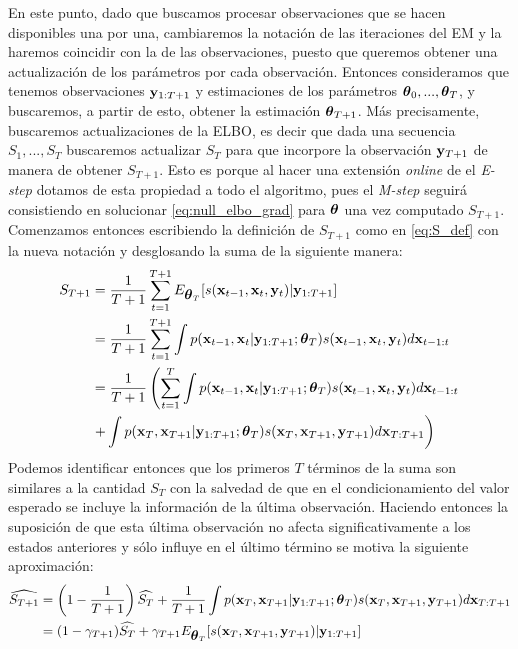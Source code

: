 En este punto, dado que buscamos procesar observaciones que se hacen disponibles una por una, cambiaremos la notación de las iteraciones del EM y la haremos coincidir con la de las observaciones, puesto que queremos obtener una actualización de los parámetros por cada observación. Entonces consideramos que tenemos observaciones $\mathbf{y}_{1:T+1}$ y estimaciones de los parámetros $\mbox{\boldmath$ \theta $}_0, ..., \mbox{\boldmath$ \theta $}_T$, y buscaremos, a partir de esto, obtener la estimación $\mbox{\boldmath$ \theta $}_{T+1}$. Más precisamente, buscaremos actualizaciones de la ELBO, es decir que dada una secuencia $S_1, ..., S_T$ buscaremos actualizar $S_T$ para que incorpore la observación $\mathbf{y}_{T+1}$ de manera de obtener $S_{T+1}$. Esto es porque al hacer una extensión \textit{online} de el \textit{E-step} dotamos de esta propiedad a todo el algoritmo, pues el \textit{M-step} seguirá consistiendo en solucionar \ref{eq:null_elbo_grad} para $\mbox{\boldmath$ \theta $}$ una vez computado $S_{T+1}$. Comenzamos entonces escribiendo la definición de $S_{T+1}$ como en \ref{eq:S_def} con la nueva notación y desglosando la suma de la siguiente manera:
\begin{align}
    S_{T+1} &= \frac{1}{T+1}\sum_{t=1}^{T+1} E_{\mbox{\boldmath$ \theta $}_T} [s(\mathbf{x}_{t-1}, \mathbf{x}_t, \mathbf{y}_t) | \mathbf{y}_{1:T+1}] \\
    &= \frac{1}{T+1}\sum_{t=1}^{T+1} \int p(\mathbf{x}_{t-1}, \mathbf{x}_t | \mathbf{y}_{1:T+1}; \mbox{\boldmath$ \theta $}_T) s(\mathbf{x}_{t-1}, \mathbf{x}_t, \mathbf{y}_t) d\mathbf{x}_{t-1:t}\\
    &= \frac{1}{T+1} \left( \sum_{t=1}^{T} \int p(\mathbf{x}_{t-1}, \mathbf{x}_t | \mathbf{y}_{1:T+1}; \mbox{\boldmath$ \theta $}_T) s(\mathbf{x}_{t-1}, \mathbf{x}_t, \mathbf{y}_t)  d\mathbf{x}_{t-1:t} \right.\\ 
    &\left. + \int p(\mathbf{x}_{T}, \mathbf{x}_{T+1} | \mathbf{y}_{1:T+1}; \mbox{\boldmath$ \theta $}_T) s(\mathbf{x}_{T}, \mathbf{x}_{T+1}, \mathbf{y}_{T+1}) d\mathbf{x}_{T:T+1} \right)
\end{align}
Podemos identificar entonces que los primeros $T$ términos de la suma son similares a la cantidad $S_T$ con la salvedad de que en el condicionamiento del valor esperado se incluye la información de la última observación. Haciendo entonces la suposición de que esta última observación no afecta significativamente a los estados anteriores y sólo influye en el último término se motiva la siguiente aproximación:
\begin{align}
    \widehat{S_{T+1}} &= \left(1 - \frac{1}{T+1}\right) \widehat{S_T} + \frac{1}{T+1} \int p(\mathbf{x}_{T}, \mathbf{x}_{T+1} | \mathbf{y}_{1:T+1}; \mbox{\boldmath$ \theta $}_T) s(\mathbf{x}_{T}, \mathbf{x}_{T+1}, \mathbf{y}_{T+1}) d\mathbf{x}_{T:T+1} \\
    &= (1 - \gamma_{T+1}) \widehat{S_T} + \gamma_{T+1} E_{\mbox{\boldmath$ \theta $}_T} [s(\mathbf{x}_T, \mathbf{x}_{T+1}, \mathbf{y}_{T+1}) | \mathbf{y}_{1:T+1}] \label{eq:onlineEM_S_rescursion}
\end{align}


